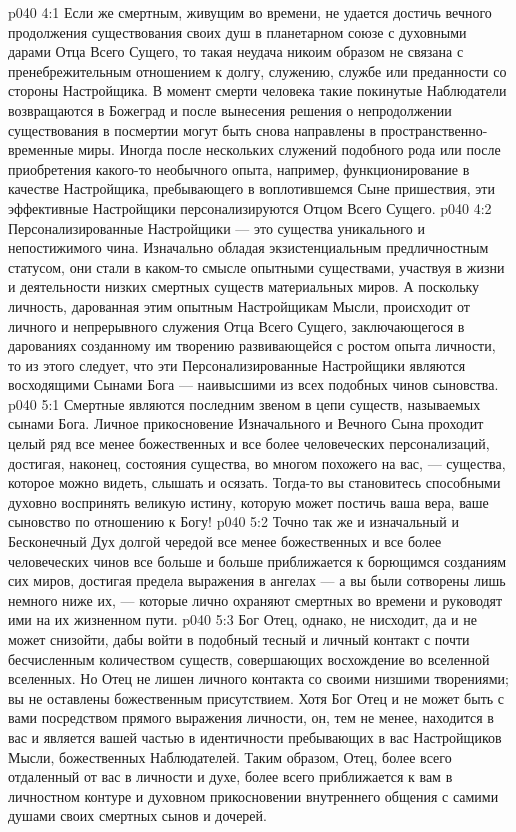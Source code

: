 \vs p040 4:1 Если же смертным, живущим во времени, не удается достичь вечного продолжения существования своих душ в планетарном союзе с духовными дарами Отца Всего Сущего, то такая неудача никоим образом не связана с пренебрежительным отношением к долгу, служению, службе или преданности со стороны Настройщика. В момент смерти человека такие покинутые Наблюдатели возвращаются в Божеград и после вынесения решения о непродолжении существования в посмертии могут быть снова направлены в пространственно\hyp{}временные миры. Иногда после нескольких служений подобного рода или после приобретения какого\hyp{}то необычного опыта, например, функционирование в качестве Настройщика, пребывающего в воплотившемся Сыне пришествия, эти эффективные Настройщики персонализируются Отцом Всего Сущего.
\vs p040 4:2 Персонализированные Настройщики --- это существа уникального и непостижимого чина. Изначально обладая экзистенциальным предличностным статусом, они стали в каком\hyp{}то смысле опытными существами, участвуя в жизни и деятельности низких смертных существ материальных миров. А поскольку личность, дарованная этим опытным Настройщикам Мысли, происходит от личного и непрерывного служения Отца Всего Сущего, заключающегося в дарованиях созданному им творению развивающейся с ростом опыта личности, то из этого следует, что эти Персонализированные Настройщики являются восходящими Сынами Бога --- наивысшими из всех подобных чинов сыновства.
\vs p040 5:1 Смертные являются последним звеном в цепи существ, называемых сынами Бога. Личное прикосновение Изначального и Вечного Сына проходит целый ряд все менее божественных и все более человеческих персонализаций, достигая, наконец, состояния существа, во многом похожего на вас, --- существа, которое можно видеть, слышать и осязать. Тогда\hyp{}то вы становитесь способными духовно воспринять великую истину, которую может постичь ваша вера, ваше сыновство по отношению к Богу!
\vs p040 5:2 Точно так же и изначальный и Бесконечный Дух долгой чередой все менее божественных и все более человеческих чинов все больше и больше приближается к борющимся созданиям сих миров, достигая предела выражения в ангелах --- а вы были сотворены лишь немного ниже их, --- которые лично охраняют смертных во времени и руководят ими на их жизненном пути.
\vs p040 5:3 Бог Отец, однако, не нисходит, да и не может снизойти, дабы войти в подобный тесный и личный контакт с почти бесчисленным количеством существ, совершающих восхождение во вселенной вселенных. Но Отец не лишен личного контакта со своими низшими творениями; вы не оставлены божественным присутствием. Хотя Бог Отец и не может быть с вами посредством прямого выражения личности, он, тем не менее, находится в вас и является вашей частью в идентичности пребывающих в вас Настройщиков Мысли, божественных Наблюдателей. Таким образом, Отец, более всего отдаленный от вас в личности и духе, более всего приближается к вам в личностном контуре и духовном прикосновении внутреннего общения с самими душами своих смертных сынов и дочерей.
